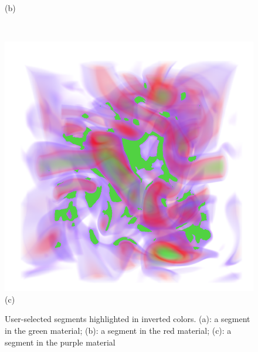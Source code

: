 \documentclass[twoside,twocolumn,10pt]{article}
\begin{document}
\begin{figure}
\begin{minipage}{.16\textwidth}
		(b)
	\end{minipage}~
	\begin{minipage}{.16\textwidth}
		\centering
		\includegraphics[width=1\linewidth]{crop/vortex_segment_purple}
		(c)
	\end{minipage}
	\caption{User-selected segments highlighted in inverted colors. (a): a segment in the green material; (b): a segment in the red material; (c): a segment in the purple material}
	\label{fig:vortex_segments}
\end{figure}
\end{document}
